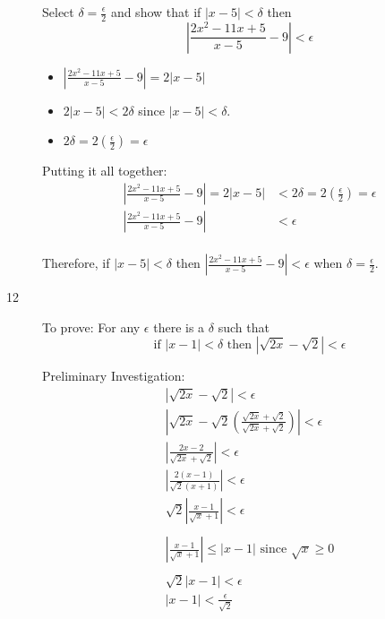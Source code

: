 \documentclass{exam}
\begin{document}
\begin{description}
  Select $\delta = \frac{\epsilon}{2}$ and show that if $|x - 5| < \delta$ then 
  \[
    \left|\frac{2x^2 - 11x + 5}{x-5} -9 \right| < \epsilon
  \]

  \vspace{0.2 cm}

  \begin{itemize}
    \item $\left|\frac{2x^2 - 11x + 5}{x-5} -9 \right| = 2|x-5|$
    \item $2|x - 5| < 2 \delta$ since $|x - 5| < \delta$.
    \item $2 \delta = 2 \left( \frac{\epsilon}{2} \right) = \epsilon$
  \end{itemize}

  Putting it all together:
  \begin{align*}
    \left|\frac{2x^2 - 11x + 5}{x-5} -9 \right| = 2|x-5| &< 2 \delta = 2 \left( \frac{\epsilon}{2} \right) = \epsilon \\ 
    \left|\frac{2x^2 - 11x + 5}{x-5} -9 \right| &< \epsilon \\ 
  \end{align*}

  Therefore, if $|x - 5| < \delta$ then $\left|\frac{2x^2 - 11x + 5}{x-5} -9 \right| < \epsilon$ when $\delta = \frac{\epsilon}{2}$.

  \item[12]
  To prove: For any $\epsilon$ there is a $\delta$ such that 
  \[
    \text{if } |x - 1| < \delta \text{ then } | \sqrt{2x} - \sqrt{2} | < \epsilon
  \]

  Preliminary Investigation:
  \begin{align*}
    | \sqrt{2x} - \sqrt{2}| < \epsilon \\
    \left| \sqrt{2x} - \sqrt{2} \left( \frac{\sqrt{2x} + \sqrt{2}}{\sqrt{2x} + \sqrt{2}} \right) \right| < \epsilon \\
    \left| \frac{2x - 2}{\sqrt{2x} + \sqrt{2}} \right| < \epsilon \\
    \left| \frac{2(x - 1)}{\sqrt{2}(x + 1)} \right| < \epsilon \\
    \sqrt{2} \left| \frac{x - 1}{\sqrt{x} + 1} \right| < \epsilon \\
    \\
    \left| \frac{x - 1}{\sqrt{x} + 1} \right| \leq |x - 1| \text{ since } \sqrt{x} \geq 0 \\
    \\
    \sqrt{2} | x - 1| < \epsilon \\
    | x - 1| < \frac{\epsilon}{\sqrt{2}} \\
  \end{align*}


\end{description}
\end{document}
